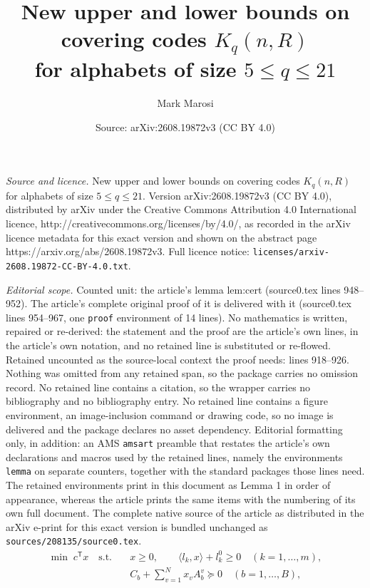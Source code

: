 \documentclass[10pt,a4paper]{amsart}
\title{New upper and lower bounds on covering codes $K_q(n,R)$\\ for alphabets of size $5\le q\le 21$}
\author{Mark Marosi}
\date{Source: arXiv:2608.19872v3 (CC BY 4.0)}
\begin{document}
\maketitle

\noindent\emph{Source and licence.} New upper and lower bounds on covering codes $K_q(n,R)$\\ for alphabets of size $5\le q\le 21$. Version arXiv:2608.19872v3 (CC BY 4.0), distributed by arXiv under the Creative Commons Attribution 4.0 International licence, http://creativecommons.org/licenses/by/4.0/, as recorded in the arXiv licence metadata for this exact version and shown on the abstract page https://arxiv.org/abs/2608.19872v3. Full licence notice: \texttt{licenses/arxiv-2608.19872-CC-BY-4.0.txt}.\par\smallskip

\noindent\textit{Editorial scope.} Counted unit: the article's lemma lem:cert (source0.tex lines 948--952). The article's complete original proof of it is delivered with it (source0.tex lines 954--967, one \texttt{proof} environment of 14 lines). No mathematics is written, repaired or re-derived: the statement and the proof are the article's own lines, in the article's own notation, and no retained line is substituted or re-flowed.  Retained uncounted as the source-local context the proof needs: lines 918--926.  Nothing was omitted from any retained span, so the package carries no omission record.  No retained line contains a citation, so the wrapper carries no bibliography and no bibliography entry.  No retained line contains a figure environment, an image-inclusion command or drawing code, so no image is delivered and the package declares no asset dependency.  Editorial formatting only, in addition: an AMS \texttt{amsart} preamble that restates the article's own declarations and macros used by the retained lines, namely the environments \texttt{lemma} on separate counters, together with the standard packages those lines need.  The retained environments print in this document as Lemma 1 in order of appearance, whereas the article prints the same items with the numbering of its own full document.  The complete native source of the article as distributed in the arXiv e-print for this exact version is bundled unchanged as \texttt{sources/208135/source0.tex}.
\begin{equation}\label{eq:sdp}
\begin{aligned}
\min\; c^{\mathsf T}x
\quad\text{s.t.}\quad
& x\ge 0,\qquad
\langle l_k,x\rangle + l_k^0 \ge 0 \quad (k=1,\dots,m),\\
& C_b + \textstyle\sum_{v=1}^{N} x_v A_b^v \succeq 0 \quad (b=1,\dots,B),
\end{aligned}
\end{equation}
\end{document}
